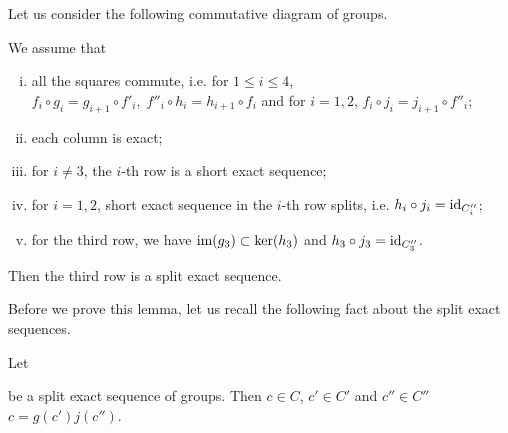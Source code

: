 \documentclass[11pt,twoside]{article}
\begin{document}
\begin{lem}\label{l.5.lem}
Let us consider the following commutative diagram of groups. 

\begin{center}
\end{center}

We assume that
\begin{enumerate}[(i)]
	\item all the squares commute, i.e. for \(1\leq i\leq 4\), \(f_i\circ g_i = g_{i+1}\circ f'_i,\; f''_i\circ h_i= h_{i+1}\circ f_i\) and for $i=1,2$, \(f_i\circ j_i=j_{i+1}\circ f''_i;\)
	\item each column is exact;
	\item for \(i\neq 3\), the \(i\)-th row is a short exact sequence; 
	\item for $i=1,2$, short exact sequence in the $i$-th row splits, i.e. \(h_i\circ j_i = \textup{id}_{C_i''}\);
	\item for the third row, we have \(\textup{im}(g_3)\subset \ker(h_3)\) and \(h_3\circ j_3 = \textup{id}_{C_3''}\).
\end{enumerate}

Then the third row is a split exact sequence.

\end{lem}

Before we prove this lemma, let us recall the following fact about the split exact sequences.

\begin{lem}\label{l.split}
Let
\begin{center}
\end{center}
be a split exact sequence of groups. Then \fa \(c\in C\), \te \(c'\in C'\) and \(c''\in C''\) \st \(c=g(c')j(c'')\).
\end{lem}
\end{document}
